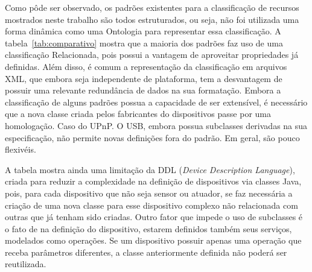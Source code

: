 Como pôde ser observado, os padrões existentes para a classificação de recursos mostrados neste trabalho são todos estruturados, ou seja, não foi utilizada uma forma dinâmica como uma Ontologia para representar essa classificação. A tabela~\ref{tab:comparativo} mostra que a maioria dos padrões faz uso de uma classificação Relacionada, pois possui a vantagem de aproveitar propriedades já definidas. Além disso, é comum a representação da classificação em arquivos XML, que embora seja independente de plataforma, tem a desvantagem de possuir uma relevante redundância de dados na sua formatação. Embora a classificação de alguns padrões possua a capacidade de ser extensível, é necessário que a nova classe criada pelos fabricantes do dispositivos passe por uma homologação. Caso do UPnP. O USB, embora possua subclasses derivadas na sua especificação, não permite novas definições fora do padrão. Em geral, são pouco flexivéis. 

A tabela mostra ainda uma limitação da DDL (\emph{Device Description Language}), criada para reduzir a complexidade na definição de dispositivos via classes Java, pois, para cada dispositivo que não seja sensor ou atuador, se faz necessária a criação de uma nova classe para esse dispositivo complexo não relacionada com outras que já tenham sido criadas. Outro fator que impede o uso de subclasses é o fato de na definição do dispositivo, estarem definidos também seus serviços, modelados como operações. Se um dispositivo possuir apenas uma operação que receba parâmetros diferentes, a classe anteriormente definida não poderá ser reutilizada. 


